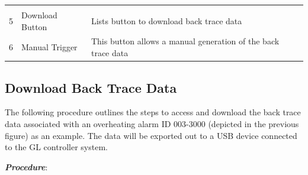 \begin{longtable}[]{@{}|l|l|l|@{}}
\begin{minipage}[t]{0.65\columnwidth}
\end{minipage}\tabularnewline
\begin{minipage}[t]{0.04\columnwidth}\raggedright
5\strut
\end{minipage} & \begin{minipage}[t]{0.23\columnwidth}\raggedright
Download Button\strut
\end{minipage} & \begin{minipage}[t]{0.65\columnwidth}\raggedright
Lists button to download back trace data\strut
\end{minipage}\tabularnewline
\begin{minipage}[t]{0.04\columnwidth}\raggedright
6\strut
\end{minipage} & \begin{minipage}[t]{0.23\columnwidth}\raggedright
Manual Trigger\strut
\end{minipage} & \begin{minipage}[t]{0.65\columnwidth}\raggedright
This button allows a manual generation of the back trace data\strut
\end{minipage}\tabularnewline
\bottomrule
\end{longtable}


\subsection{Download Back Trace
Data}

The following procedure outlines the steps to access and download the
back trace data associated with an overheating alarm ID 003-3000
(depicted in the previous figure) as an example. The data will be
exported out to a USB device connected to the GL controller system.

\textbf{\emph{Procedure}}:

